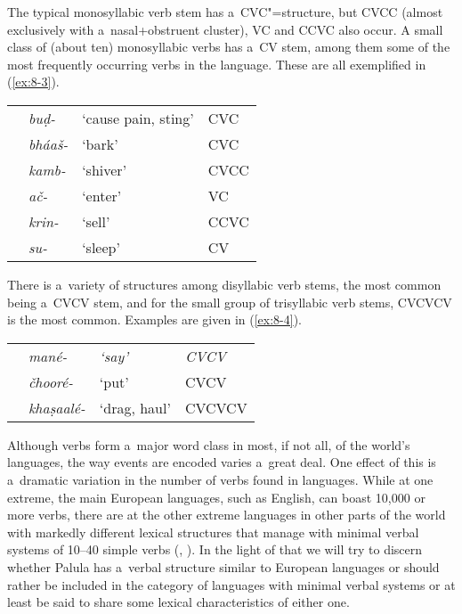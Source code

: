 The typical monosyllabic verb stem has a~CVC"=structure, but CVCC (almost exclusively with a~nasal+obstruent cluster), VC and CCVC also occur. A small class of (about ten) monosyllabic verbs has a~CV stem, among them some of the most frequently occurring verbs in the language. These are all exemplified in (\ref{ex:8-3}).


\begin{exe}
\extab
\label{ex:8-3}
\begin{tabularx}{\textwidth}{ l l l l }
&
\textit{buḍ-} &
`cause pain, sting' &
CVC\\
&
\textit{bháaš-} &
`bark' &
CVC\\
&
\textit{kamb-} &
`shiver' &
CVCC\\
&
\textit{ač-} &
`enter' &
VC\\
&
\textit{krin-} &
`sell' &
CCVC\\
&
\textit{su-} &
`sleep' &
CV\\
\end{tabularx}
\end{exe}


There is a~variety of structures among disyllabic verb stems, the most common being a~CVCV stem, and for the small group of trisyllabic verb stems, CVCVCV is the most common. Examples are given in (\ref{ex:8-4}).


\begin{exe}
\extab
\label{ex:8-4}
\begin{tabularx}{\textwidth}{ l l l l }

&
\textit{mané-} &
\textit{\textup{`say'}} &
\textit{\textup{CVCV}} \\
&
\textit{čhooré-} &
`put' &
CVCV\\
&
\textit{khaṣaalé-} &
`drag, haul' &
CVCVCV\\
\end{tabularx}
\end{exe}


Although verbs form a~major word class in most, if not all, of the world's languages, the way events are encoded varies a~great deal. One effect of this is a~dramatic variation in the number of verbs found in languages. While at one extreme, the main European languages, such as English, can boast 10,000 or more verbs, there are at the other extreme languages in other parts of the world with markedly different lexical structures that manage with minimal verbal systems of 10--40 simple verbs (\citealt[347--348]{viberg1993}, \citeyear[409]{viberg2006}). In the light of that we will try to discern whether Palula has a~verbal structure similar to European languages or should rather be included in the category of languages with minimal verbal systems or at least be said to share some lexical characteristics of either one.



